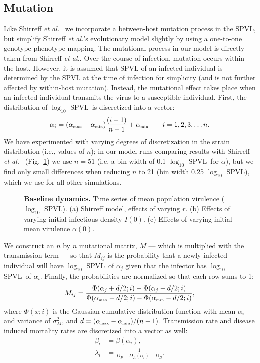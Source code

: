 \documentclass[10pt,letterpaper]{article}
\newcommand{\Lspvl}{$\log_{10}$ SPVL}
\newcommand{\etal}{\textit{et al.}}
\newcommand{\tsub}[2]{#1_{{\textrm{\tiny #2}}}}
\begin{document}
\subsection*{Mutation}

Like Shirreff \etal\ \cite{shirreff_transmission_2011} we incorporate a between-host mutation process in the SPVL, but simplify Shirreff \etal's evolutionary model slightly by using a one-to-one genotype-phenotype mapping. 
The mutational process in our model is directly taken from Shirreff \etal. Over the course of infection, mutation occurs within the host. However, it is assumed that SPVL of an infected individual is determined by the SPVL at the time of infection for simplicity (and is not further affected by within-host mutation). Instead, the mutational effect takes place when an infected individual transmits the virus to a susceptible individual. First, the distribution of \Lspvl\ is discretized into a vector:
\begin{equation}
\alpha_i =  (\tsub{\alpha}{max} - \tsub{\alpha}{min})\frac{(i-1)}{n-1} + \tsub{\alpha}{min} \qquad i = 1,2,3, \dots n.
\end{equation}
We have experimented with varying degrees of discretization in the strain distribution (i.e., values of $n$); in our model runs comparing results with Shirreff \etal\ \cite{shirreff_transmission_2011} (Fig.~\ref{fig:panel3}) we use $n=51$ (i.e. a bin width of 0.1 \Lspvl\ for $\alpha$), but we find only small differences when reducing $n$ to 21 (bin width 0.25 \Lspvl), which we use for all other simulations.

\begin{figure}[!h]
\caption{{\bf Baseline dynamics.}
Time series of mean population virulence (\Lspvl). (a) Shirreff model, effects of varying $r$. (b) Effects of varying initial infectious density $I(0)$. (c) Effects of varying initial mean virulence $\alpha(0)$.}
\label{fig:panel3}
\end{figure}

We construct an $n$ by $n$ mutational matrix, $M$ --- which is multiplied with the transmission term ---  so that $M_{ij}$ is the probability that a newly infected individual will have \Lspvl\ of $\alpha_j$ given that the infector has \Lspvl\ of $\alpha_i$. Finally, the probabilities are normalized so that each row sums to 1:
\begin{equation}
M_{ij} = \frac{\Phi(\alpha_j + d/2;i) - \Phi(\alpha_j - d/2;i)}{\Phi(\tsub{\alpha}{max} + d/2;i) - \Phi(\tsub{\alpha}{min} - d/2;i)},
\end{equation}
where $\Phi(x;i)$ is the Gaussian cumulative distribution function with mean $\alpha_i$ and variance of $\sigma_M^2$, and $d = (\tsub{\alpha}{max} - \tsub{\alpha}{min})/(n-1)$. Transmission rate and disease induced mortality rates are discretized into a vector as well:
\begin{equation}
\begin{aligned}
\beta_i &= \beta(\alpha_i),\\
\lambda_i &= \frac{1}{D_P + D_A (\alpha_i) + D_D}.
\end{aligned}
\end{equation}
\end{document}
